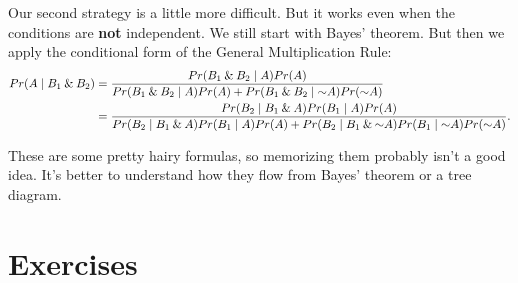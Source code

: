 \documentclass[justified]{tufte-book}
\newcommand{\given}{\mid}
\renewcommand{\neg}{\mathbin{\sim}}
\renewcommand{\wedge}{\mathbin{\&}}
\newcommand{\p}{Pr}
\theoremstyle{definition}
\theoremstyle{definition}
\theoremstyle{definition}
\theoremstyle{remark}
\begin{document}
Our second strategy is a little more difficult. But it works even when
the conditions are \textbf{not} independent. We still start with Bayes'
theorem. But then we apply the conditional form of the General
Multiplication Rule: \[
  \begin{aligned}
    \p(A \given B_1 \wedge B_2) &= 
      \frac{\p(B_1 \wedge B_2 \given A)\p(A)}{%
            \p(B_1 \wedge B_2 \given A)\p(A) +%
              \p(B_1 \wedge B_2 \given \neg A)\p(\neg A)}\\
      &= \frac{\p(B_2 \given B_1 \wedge A)\p(B_1 \given A)\p(A)}{%
                \p(B_2 \given B_1 \wedge A)\p(B_1 \given A)\p(A) +%
                  \p(B_2 \given B_1 \wedge \neg A)\p(B_1 \given \neg A)\p(\neg A)}.
  \end{aligned}
\]

These are some pretty hairy formulas, so memorizing them probably isn't
a good idea. It's better to understand how they flow from Bayes' theorem
or a tree diagram.

\hypertarget{exercises-7}{%
\section*{Exercises}\label{exercises-7}}
\end{document}
